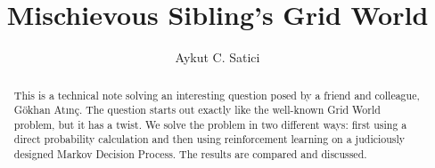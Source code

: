 \begin{frontmatter}



\title{Mischievous Sibling's Grid World}


\author[label1]{Aykut C. Satici}




\begin{abstract}
    This is a technical note solving an interesting question posed by a friend 
    and colleague, G\"{o}khan At{\i}n\c{c}. The question starts out
    exactly like the well-known Grid World problem, but it has a twist. We solve
    the problem in two different ways: first using a direct probability
    calculation and then using reinforcement learning on a judiciously designed
    Markov Decision Process. The results are compared and discussed.
\end{abstract}


\end{frontmatter}
